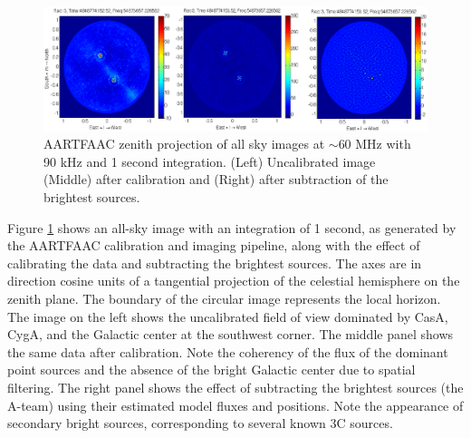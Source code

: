 \documentclass{aa}
\begin{document}
\begin{figure}[t]
\includegraphics[width=1\textwidth]{Figs/uncal_cal_deconv_night.eps}
\caption{AARTFAAC zenith projection of all sky images at $\sim$$60$  MHz with 90 kHz
  and  1   second  integration.   (Left)  Uncalibrated  image   (Middle)  after
  calibration and (Right) after subtraction of the brightest sources.}
\label{fig:uncal_cal_deconv_night}
\end{figure}

Figure   \ref{fig:uncal_cal_deconv_night}  shows  an   all-sky  image   with  an
integration of  1 second, as generated  by the AARTFAAC  calibration and imaging
pipeline,  along with the  effect of  calibrating the  data and  subtracting the
brightest  sources.  The  axes are  in direction  cosine units  of  a tangential
projection of the celestial hemisphere on the zenith plane.  The boundary of the
circular image  represents the local  horizon. The image  on the left  shows the
uncalibrated field of  view dominated by CasA, CygA, and  the Galactic center at
the southwest  corner. The middle panel shows the  same data after calibration.
Note the coherency of the flux of the dominant point sources and the absence of
the bright Galactic center due to  spatial filtering.  The right panel shows the
effect of subtracting  the brightest sources (the A-team)  using their estimated
model fluxes  and positions.  Note  the appearance of secondary  bright sources,
corresponding to several known 3C sources.

 
\end{document}
